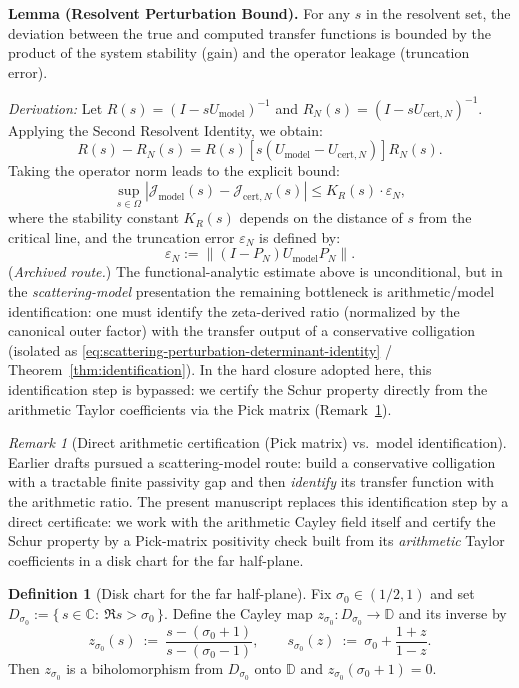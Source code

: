 \documentclass[11pt]{article}
\theoremstyle{definition}
\newtheorem{definition}[theorem]{Definition}
\theoremstyle{remark}
\newtheorem{remark}[theorem]{Remark}
\theoremstyle{definition}
\newcommand{\C}{\mathbb{C}}
\begin{document}
\textbf{Lemma (Resolvent Perturbation Bound).}
For any $s$ in the resolvent set, the deviation between the true and computed transfer functions is bounded by the product of the system stability (gain) and the operator leakage (truncation error).

\textit{Derivation:}
Let $R(s) = (I - sU_{\mathrm{model}})^{-1}$ and $R_N(s) = (I - sU_{\mathrm{cert},N})^{-1}$. Applying the Second Resolvent Identity, we obtain:
\[
    R(s) - R_N(s) = R(s) \left[ s(U_{\mathrm{model}} - U_{\mathrm{cert},N}) \right] R_N(s).
\]
Taking the operator norm leads to the explicit bound:
\[
    \sup_{s \in \Omega} |\mathcal{J}_{\mathrm{model}}(s) - \mathcal{J}_{\mathrm{cert},N}(s)| \leq K_R(s) \cdot \varepsilon_N,
\]
where the stability constant $K_R(s)$ depends on the distance of $s$ from the critical line, and the truncation error $\varepsilon_N$ is defined by:
\[
    \varepsilon_N := \| (I - P_N) U_{\mathrm{model}} P_N \|.
\]
(\emph{Archived route.}) The functional-analytic estimate above is unconditional, but in the \emph{scattering-model} presentation the remaining bottleneck is arithmetic/model identification: one must identify the zeta-derived ratio (normalized by the canonical outer factor) with the transfer output of a conservative colligation (isolated as \eqref{eq:scattering-perturbation-determinant-identity} / Theorem~\ref{thm:identification}).
In the hard closure adopted here, this identification step is bypassed: we certify the Schur property directly from the arithmetic Taylor coefficients via the Pick matrix (Remark~\ref{rem:functional-vs-arithmetic}).

\begin{remark}[Direct arithmetic certification (Pick matrix) vs.\ model identification]\label{rem:functional-vs-arithmetic}
Earlier drafts pursued a scattering-model route: build a conservative colligation with a tractable finite passivity gap and then \emph{identify} its transfer function with the arithmetic ratio.
The present manuscript replaces this identification step by a direct certificate: we work with the arithmetic Cayley field itself and certify the Schur property by a Pick-matrix positivity check built from its \emph{arithmetic} Taylor coefficients in a disk chart for the far half-plane.
\end{remark}

\begin{definition}[Disk chart for the far half-plane]\label{def:disk-map-far}
Fix $\sigma_0\in(1/2,1)$ and set $D_{\sigma_0}:=\{\,s\in\C:\ \Re s>\sigma_0\,\}$.
Define the Cayley map $z_{\sigma_0}:D_{\sigma_0}\to\mathbb D$ and its inverse by
\[
  z_{\sigma_0}(s)\ :=\ \frac{s-(\sigma_0+1)}{s-(\sigma_0-1)},
  \qquad
  s_{\sigma_0}(z)\ :=\ \sigma_0+\frac{1+z}{1-z}.
\]
Then $z_{\sigma_0}$ is a biholomorphism from $D_{\sigma_0}$ onto $\mathbb D$ and $z_{\sigma_0}(\sigma_0+1)=0$.
\end{definition}
\end{document}
